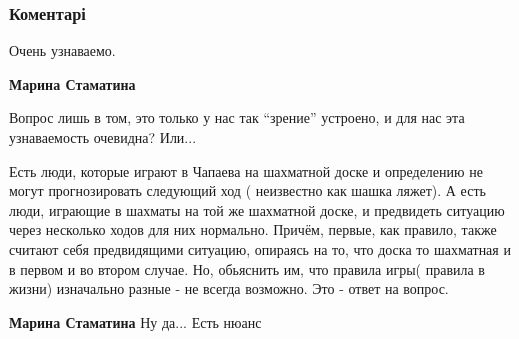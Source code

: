  
 
 
 
 
\subsubsection{Коментарі}

\begin{itemize} %
Очень узнаваемо.

\textbf{Марина Стаматина} 

Вопрос лишь в том, это только у нас так \enquote{зрение} устроено, и для нас эта
узнаваемость очевидна? Или...


Есть люди, которые играют в Чапаева на шахматной доске и определению не могут
прогнозировать следующий ход ( неизвестно как шашка ляжет). А есть люди,
играющие в шахматы на той же шахматной доске, и предвидеть ситуацию через
несколько ходов для них нормально. Причём, первые, как правило, также считают
себя предвидящими ситуацию, опираясь на то, что доска то шахматная и в первом и
во втором случае. Но, обьяснить им, что правила игры( правила в жизни)
изначально разные - не всегда возможно. Это - ответ на вопрос.


\textbf{Марина Стаматина} Ну да... Есть нюанс

\end{itemize} %
